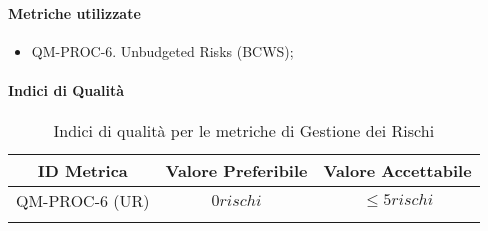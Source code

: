 		\paragraph{Metriche utilizzate}

			\begin{itemize}
				\item QM-PROC-6. Unbudgeted Risks (BCWS);
			\end{itemize}

		\paragraph{Indici di Qualità}

			\begin{center}
				\begin{longtable}{|c|c|c|}
				\hline
				\rowcolor{lighter-grayer}
				\textbf{ID Metrica} & \textbf{Valore Preferibile} & \textbf{Valore Accettabile}\\
				\hline
				\endfirsthead
				\hline
				QM-PROC-6 (UR) & \(0 rischi\) & \(\le 5 rischi\) \\
				\hline
				\caption{Indici di qualità per le metriche di Gestione dei Rischi}
				\end{longtable}
			\end{center}

